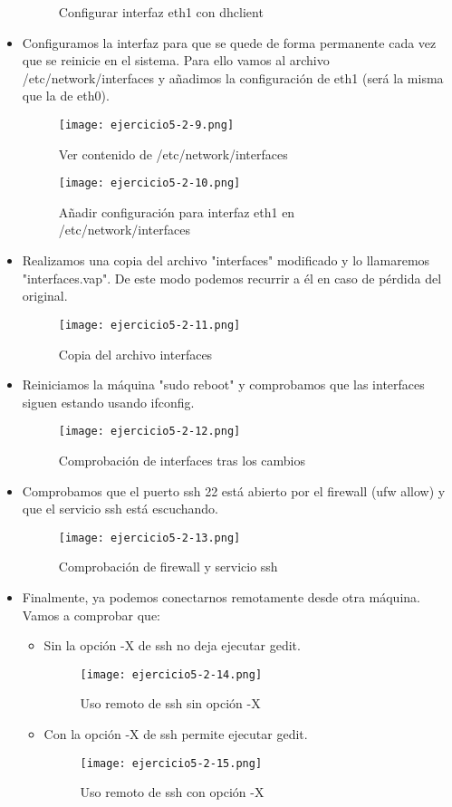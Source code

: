 \begin{itemize}
\begin{figure}[H]
				\label{figura44} 
				\caption{Configurar interfaz eth1 con dhclient}
			\end{figure}
		\item Configuramos la interfaz\cite{ejercicio5-9} para que se quede de forma permanente cada vez que se reinicie en el sistema. Para ello vamos al archivo /etc/network/interfaces y añadimos la configuración de eth1 (será la misma que la de eth0).
			\begin{figure}[H] 
				\centering
				\texttt{[image: ejercicio5-2-9.png]} 
				\label{figura45} 
				\caption{Ver contenido de /etc/network/interfaces}
			\end{figure}
			\begin{figure}[H] 
				\centering
				\texttt{[image: ejercicio5-2-10.png]} 
				\label{figura46} 
				\caption{Añadir configuración para interfaz eth1 en /etc/network/interfaces}
			\end{figure}
		\item Realizamos una copia del archivo "interfaces" modificado y lo llamaremos "interfaces.vap". De este modo podemos recurrir a él en caso de pérdida del original.
			\begin{figure}[H] 
				\centering
				\texttt{[image: ejercicio5-2-11.png]} 
				\label{figura47} 
				\caption{Copia del archivo interfaces}
			\end{figure}
		\item Reiniciamos la máquina "sudo reboot" y comprobamos que las interfaces siguen estando usando ifconfig.
			\begin{figure}[H] 
				\centering
				\texttt{[image: ejercicio5-2-12.png]} 
				\label{figura48} 
				\caption{Comprobación de interfaces tras los cambios}
			\end{figure}
		\item Comprobamos que el puerto ssh 22 está abierto por el firewall (ufw allow) y que el servicio ssh está escuchando.
			\begin{figure}[H] 
				\centering
				\texttt{[image: ejercicio5-2-13.png]} 
				\label{figura49} 
				\caption{Comprobación de firewall y servicio ssh}
			\end{figure}
		\item Finalmente, ya podemos conectarnos remotamente desde otra máquina. Vamos a comprobar que:
			\begin{itemize}
				\item Sin la opción -X de ssh no deja ejecutar gedit.
					\begin{figure}[H] 
						\centering
						\texttt{[image: ejercicio5-2-14.png]} 
						\label{figura50} 
						\caption{Uso remoto de ssh sin opción -X}
					\end{figure}
				\item Con la opción -X de ssh permite ejecutar gedit.
					\begin{figure}[H] 
						\centering
						\texttt{[image: ejercicio5-2-15.png]} 
						\label{figura51} 
						\caption{Uso remoto de ssh con opción -X}
					\end{figure}
			\end{itemize}
	\end{itemize}
	
